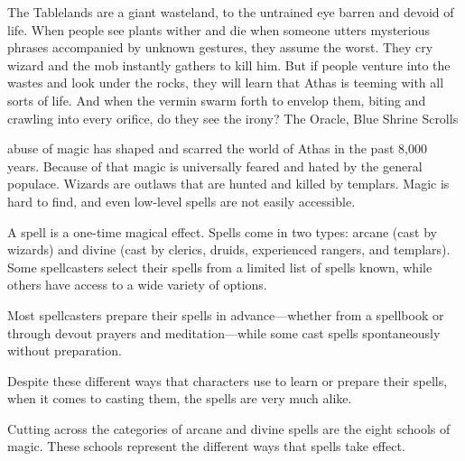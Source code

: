 {The Tablelands are a giant wasteland, to the untrained eye barren and devoid of life. When people see plants wither and die when someone utters mysterious phrases accompanied by unknown gestures, they assume the worst. They cry wizard and the mob instantly gathers to kill him. But if people venture into the wastes and look under the rocks, they will learn that Athas is teeming with all sorts of life. And when the vermin swarm forth to envelop them, biting and crawling into every orifice, do they see the irony?}
{The Oracle, Blue Shrine Scrolls}

 abuse of magic has shaped and scarred the world of Athas in the past 8,000 years. Because of that magic is universally feared and hated by the general populace. Wizards are outlaws that are hunted and killed by templars. Magic is hard to find, and even low-level spells are not easily accessible.

A spell is a one-time magical effect. Spells come in two types: arcane (cast by wizards) and divine (cast by clerics, druids, experienced rangers, and templars). Some spellcasters select their spells from a limited list of spells known, while others have access to a wide variety of options.

Most spellcasters prepare their spells in advance---whether from a spellbook or through devout prayers and meditation---while some cast spells spontaneously without preparation.

Despite these different ways that characters use to learn or prepare their spells, when it comes to casting them, the spells are very much alike.

Cutting across the categories of arcane and divine spells are the eight schools of magic. These schools represent the different ways that spells take effect.




